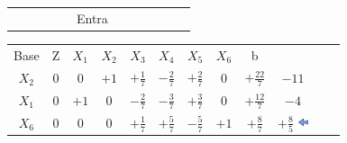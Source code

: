 \begin{frame}
{\begin{table}
\begin{tabular}{c c c c c c c c c c c c}
				& & & & & \scriptsize Entra \\
			\end{tabular}
		\end{table}			
	}
	{
		\begin{table}		
			\begin{tabular}{c c c c c c c c c c c c}
				\cellcolor{blue!100} \color{white} \scriptsize Base 
				&\cellcolor{blue!100} \color{red} \scriptsize Z 
				&\cellcolor{blue!100} \color{red} $\scriptstyle X_1$ 
				&\cellcolor{blue!100} \color{red} $\scriptstyle X_2$ 
				&\cellcolor{blue!100} \color{white}   $\scriptstyle X_3$ 
				&\cellcolor{blue!100} \color{white} $\scriptstyle X_4$ 
				&\cellcolor{blue!100} \color{white}   $\scriptstyle X_5$ 
				&\cellcolor{blue!100} \color{red}   $\scriptstyle X_6$ 
				&\cellcolor{blue!100} \color{white} \scriptsize b \\
				\cellcolor{blue!100} \color{red} $\scriptstyle X_2$
				& \cellcolor{yellow!50} $\scriptstyle 0$
				& \cellcolor{yellow!50} $\scriptstyle 0$
				& \cellcolor{yellow!50} $\scriptstyle +1$
				& \cellcolor{yellow!50} $\scriptstyle +\frac{1}{7}$
				& \cellcolor{gray!50} $\scriptstyle -\frac{2}{7}$
				& \cellcolor{yellow!50} $\scriptstyle +\frac{2}{7}$
				& \cellcolor{yellow!50} $\scriptstyle 0$
				& \cellcolor{gray!50} $\scriptstyle +\frac{22}{7}$
				& $ \scriptstyle -11$ \\
			    \cellcolor{blue!100} \color{red} $\scriptstyle X_1$
				& \cellcolor{yellow!50} $\scriptstyle 0$
				& \cellcolor{yellow!50} $\scriptstyle +1$
				& \cellcolor{yellow!50} $\scriptstyle 0$
				& \cellcolor{yellow!50} $\scriptstyle -\frac{2}{7}$			
				& \cellcolor{gray!50} $\scriptstyle -\frac{3}{7}$
				& \cellcolor{yellow!50} $\scriptstyle +\frac{3}{7}$
				& \cellcolor{yellow!50} $\scriptstyle 0$ 
				& \cellcolor{gray!50} $\scriptstyle +\frac{12}{7}$
				& $ \scriptstyle -4 $  \\
				\cellcolor{blue!100} \color{red} $\scriptstyle X_6$
				& \cellcolor{yellow!50} $\scriptstyle 0$
				& \cellcolor{yellow!50} $\scriptstyle 0$
				& \cellcolor{yellow!50} $\scriptstyle 0$
				& \cellcolor{yellow!50} $\scriptstyle +\frac{1}{7}$
				& \cellcolor{gray!50} $\scriptstyle +\frac{5}{7}$
				& \cellcolor{yellow!50} $\scriptstyle -\frac{5}{7}$
				& \cellcolor{yellow!50} $\scriptstyle +1$
				& \cellcolor{gray!50} $\scriptstyle +\frac{8}{7}$
				& $ \scriptstyle +\frac{8}{5}$ \includegraphics[width=0.3cm,height=0.3cm]{setaesquerda.jpg}\\

\end{tabular}
\end{table}}
\end{frame}
